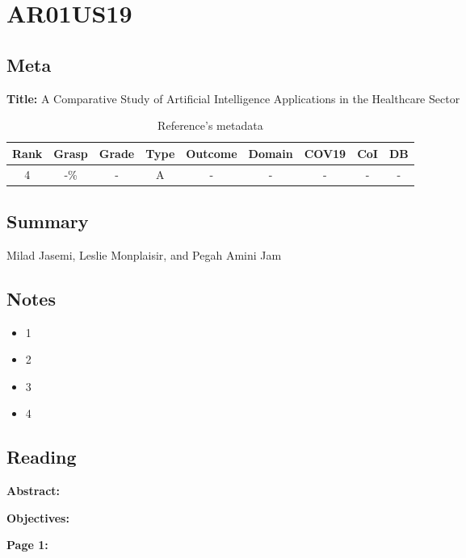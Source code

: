 \section{ AR01US19 }


\subsection{Meta}

    \textbf{Title:}
    A Comparative Study of Artificial Intelligence Applications in the Healthcare Sector

    \begin{table}[H]
        \centering
        \begin{tabular}{|c|c|c|c|c|c|c|c|c|}
            \hline
                \textbf{Rank} & \textbf{Grasp} & \textbf{Grade} & \textbf{Type} & \textbf{Outcome} & \textbf{Domain} & \textbf{COV19} & \textbf{CoI} & \textbf{DB} \\
            \hline
                4 & -\% & - & A & - & - & - & - & - \\
            \hline
        \end{tabular}
        \caption{Reference's metadata}
        \label{tab:AR01US19}
    \end{table}

\subsection{Summary}
    Milad Jasemi, Leslie Monplaisir, and Pegah Amini Jam \cite{x161}

\subsection{Notes}
    \begin{itemize}
        \item 1
        \item 2
        \item 3
        \item 4
    \end{itemize}


\subsection{Reading}
    \textbf{Abstract:}

    
    \textbf{Objectives:}

    
    \textbf{Page 1:}
    